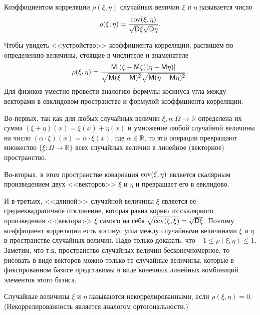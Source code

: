\begin{definition}
\label{def:19.7}
	Коэффициентом корреляции $\rho(\xi, \eta)$ случайных величин $\xi$ и $\eta$ называется число
	\begin{equation*}
		\rho(\xi,\eta)=\frac{\operatorname{cov}(\xi,\eta)}{\sqrt{\mathsf{D}\xi}\sqrt{\mathsf{D}\eta}}.
	\end{equation*}
\end{definition}
\begin{zam}\label{zam:19.8}
	Чтобы увидеть <<устройство>> коэффициента корреляции, распишем по определению величины, стоящие в числителе и знаменателе
	\begin{equation*}
		\rho(\xi, \eta)=\frac{\mathsf{M}[(\xi-\mathsf{M} \xi)(\eta-\mathsf{M}\eta)]}
		{\sqrt{\mathsf{M}(\xi-\mathsf{M})^2}\sqrt{\mathsf{M}(\eta-\mathsf{M}\eta)^2}}.
	\end{equation*}
		Для физиков уместно провести аналогию формулы косинуса угла между
	векторами в евклидовом пространстве и формулой коэффициента корреляции.
	
	Во-первых, так как для любых случайных величин 
	$\xi, \eta : \Omega \to \mathbb{R}$ определена их сумма 
	$(\xi +\eta)(x) = \xi(x)+\eta(x)$ и умножение любой случайной величины на число 
	$(\alpha \cdot \xi)(x) = \alpha \cdot \xi(x)$, где $\alpha \in \mathbb{R}$, то эти операции превращают
	множество $\{\xi : \Omega \to \mathbb{R}\}$ всех случайных величин в линейное (векторное)	пространство.
	
	Во-вторых, в этом пространстве ковариация $\operatorname{cov}(\xi, \eta)$ является скалярным произведением двух <<векторов>> $\xi$ и $\eta$ и превращает его в евклидово.

	И в-третьих, <<длиной>> случайной величины $\xi$ является её среднеквадратичное отклонение, которая равна корню из скалярного произведения <<вектора>> $\xi$ самого на себя
	$\sqrt{\operatorname{cov}(\xi, \xi)}=\sqrt{\mathsf{D}\xi}$. Поэтому коэффициент корреляции есть косинус угла между случайными величинами $\xi$ и $\eta$ в пространстве случайных величин. Надо только доказать, что $−1 \leqslant \rho(\xi, \eta) \leqslant 1$. Заметим, что т.к. пространство случайных величин бесконечномерное, то рисовать в виде векторов можно только те случайные величины, которые	в фиксированном базисе представимы в виде конечных линейных комбинаций элементов этого базиса.
\end{zam}

\begin{definition}
\label{def:19.9}
	Случайные величины $\xi$ и $\eta$ называются некоррелированными, если $\rho(\xi, \eta) = 0$. (Некоррелированность является аналогом
ортогональности.)
\end{definition}


